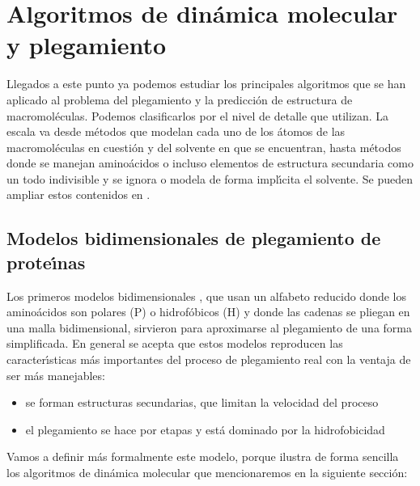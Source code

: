 \section{Algoritmos de din\'{a}mica molecular y plegamiento} \label{macro3}
 
Llegados a este punto ya podemos estudiar los principales algoritmos que se han aplicado al problema
del plegamiento y la predicci\'{o}n de estructura de macromol\'{e}culas. Podemos clasificarlos por el nivel 
de detalle que utilizan. La escala va desde m\'{e}todos que modelan cada uno de los \'{a}tomos de 
las macromol\'{e}culas en cuesti\'{o}n y del solvente en que se encuentran, hasta m\'{e}todos donde se manejan amino\'{a}cidos
o incluso elementos de estructura secundaria como un todo indivisible y se ignora o modela de forma impl\'\i{}cita el 
solvente. Se pueden ampliar estos contenidos en \citep{pascual_garcia_alberto_2014_1066348}.

\subsection{Modelos bidimensionales de plegamiento de prote\'\i{}nas}
Los primeros modelos bidimensionales \citep{Dill1995,MorenoHernandez2012,Shakhnovich1993}, que usan un alfabeto reducido donde los
amino\'{a}cidos son polares (P) o hidrof\'{o}bicos (H) y donde las cadenas se pliegan en una malla bidimensional, sirvieron
para aproximarse al plegamiento de una forma simplificada. En general se acepta que estos 
modelos reproducen las caracter\'\i{}sticas m\'{a}s importantes del proceso de plegamiento real con la ventaja 
de ser m\'{a}s manejables:
\begin{itemize}
\item se forman estructuras secundarias, que limitan la velocidad del proceso
\item el plegamiento se hace por etapas y est\'{a} dominado por la hidrofobicidad
\end{itemize}

Vamos a definir m\'{a}s formalmente este modelo, porque ilustra de forma sencilla los algoritmos de din\'{a}mica molecular
que mencionaremos en la siguiente secci\'{o}n:

